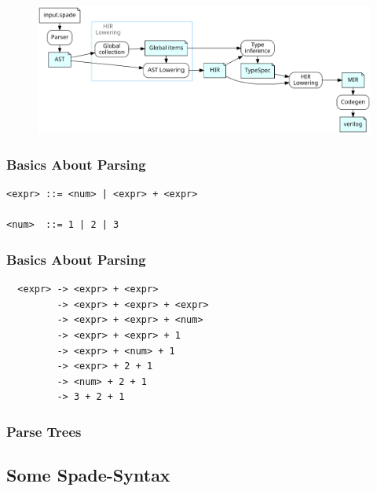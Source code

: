 \documentclass{beamer}
\begin{document}
\begin{frame}
\begin{figure}[h!]
  \includegraphics[width=\textwidth]{figures/architecture.png}
  \label{figArch}
\end{figure}
\end{frame}

\begin{frame}[containsverbatim]
\frametitle{Basics About Parsing}
\begin{verbatim}
<expr> ::= <num> | <expr> + <expr>

<num>  ::= 1 | 2 | 3
\end{verbatim}
\end{frame}

\begin{frame}[containsverbatim]
\frametitle{Basics About Parsing}
\begin{verbatim}
  <expr> -> <expr> + <expr>
         -> <expr> + <expr> + <expr>
         -> <expr> + <expr> + <num>
         -> <expr> + <expr> + 1
         -> <expr> + <num> + 1
         -> <expr> + 2 + 1
         -> <num> + 2 + 1
         -> 3 + 2 + 1
\end{verbatim}
\end{frame}


\begin{frame}[containsverbatim]
\frametitle{Parse Trees}
\large
\centering
{}
\end{frame}

\subsection{Some Spade-Syntax}
\end{document}
